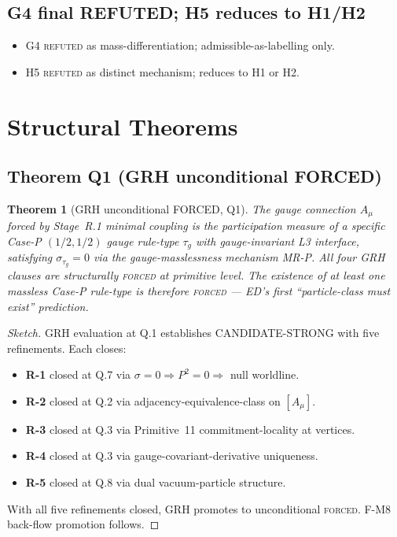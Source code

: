 \documentclass[11pt,a4paper]{article}
\newtheorem{theorem}{Theorem}[section]
\begin{document}
\subsection{G4 final REFUTED; H5 reduces to H1/H2}

\begin{itemize}
  \item G4 \textsc{refuted} as mass-differentiation; admissible-as-labelling only.
  \item H5 \textsc{refuted} as distinct mechanism; reduces to H1 or H2.
\end{itemize}

\section{Structural Theorems}

\subsection{Theorem Q1 (GRH unconditional FORCED)}

\begin{theorem}[GRH unconditional FORCED, Q1]
The gauge connection $A_\mu$ forced by Stage~R.1 minimal coupling is the participation measure of a specific Case-P $(1/2, 1/2)$ gauge rule-type $\tau_g$ with gauge-invariant L3 interface, satisfying $\sigma_{\tau_g} = 0$ via the gauge-masslessness mechanism MR-P. All four GRH clauses are structurally \textsc{forced} at primitive level. The existence of at least one massless Case-P rule-type is therefore \textsc{forced} --- ED's first ``particle-class must exist'' prediction.
\end{theorem}

\begin{proof}[Sketch]
GRH evaluation at Q.1 establishes CANDIDATE-STRONG with five refinements. Each closes:
\begin{itemize}
  \item \textbf{R-1} closed at Q.7 via $\sigma = 0 \Rightarrow P^2 = 0 \Rightarrow$ null worldline.
  \item \textbf{R-2} closed at Q.2 via adjacency-equivalence-class on $[A_\mu]$.
  \item \textbf{R-3} closed at Q.3 via Primitive~11 commitment-locality at vertices.
  \item \textbf{R-4} closed at Q.3 via gauge-covariant-derivative uniqueness.
  \item \textbf{R-5} closed at Q.8 via dual vacuum-particle structure.
\end{itemize}
With all five refinements closed, GRH promotes to unconditional \textsc{forced}. F-M8 back-flow promotion follows.
\end{proof}
\end{document}
